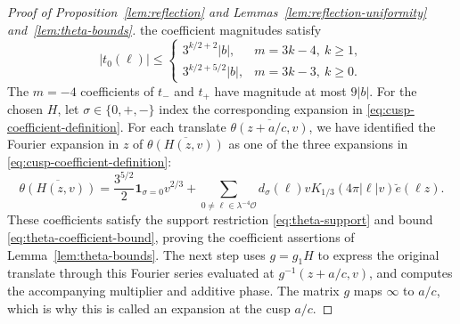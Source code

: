 \documentclass[11pt,a4paper]{article}
\numberwithin{equation}{section}
\numberwithin{figure}{section}
\theoremstyle{definition}
\theoremstyle{remark}
\newcommand{\OO}{\mathcal O}
\newcommand{\ind}{\mathbf1}
\begin{document}
\begin{proof}[Proof of Proposition~\ref{lem:reflection} and Lemmas~\ref{lem:reflection-uniformity} and~\ref{lem:theta-bounds}]
the coefficient magnitudes satisfy
\[
 |t_0(\ell)|\le
 \begin{cases}
 3^{k/2+2}|b|,&m=3k-4,\ k\ge1,\\
 3^{k/2+5/2}|b|,&m=3k-3,\ k\ge0.
 \end{cases}
\]
The $m=-4$ coefficients of $t_-$ and $t_+$ have magnitude at most $9|b|$. 
For the chosen $H$, let $\sigma\in\{0,+,-\}$ index the corresponding expansion in \eqref{eq:cusp-coefficient-definition}.
For each translate $\overline{\theta(z+a/c,v)}$, we have identified
the Fourier expansion in $z$ of $\overline{\theta(H(z,v))}$ as one
of the three expansions in \eqref{eq:cusp-coefficient-definition}:
\[
 \overline{\theta(H(z,v))}
 =\frac{3^{5/2}}2\ind_{\sigma=0}v^{2/3}
 +\sum_{0\ne\ell\in\lambda^{-4}\OO}
 d_\sigma(\ell)vK_{1/3}(4\pi|\ell|v)\breve e(\ell z).
\]
These coefficients satisfy the support restriction
\eqref{eq:theta-support} and bound \eqref{eq:theta-coefficient-bound},
proving the coefficient assertions of Lemma~\ref{lem:theta-bounds}.
The next step uses $g=g_1H$ to express the original translate through
this Fourier series evaluated at $g^{-1}(z+a/c,v)$, and computes
the accompanying multiplier and additive phase. The matrix $g$
maps $\infty$ to $a/c$, which is why this is called an expansion
at the cusp $a/c$.


\end{proof}
\end{document}
